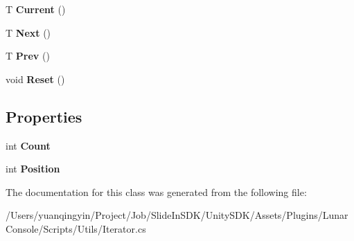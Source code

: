 \begin{DoxyCompactItemize}
T {\bfseries Current} ()
\item 
\mbox{\label{class_lunar_console_plugin_internal_1_1_iterator_a740bda9b06afc0dfcdf64cd828bdd88b}} 
T {\bfseries Next} ()
\item 
\mbox{\label{class_lunar_console_plugin_internal_1_1_iterator_a524207c5acfe8e4b395f27b723c80acf}} 
T {\bfseries Prev} ()
\item 
\mbox{\label{class_lunar_console_plugin_internal_1_1_iterator_a2bc5705d20b3c44dd0ae2b2ce7c2a223}} 
void {\bfseries Reset} ()
\end{DoxyCompactItemize}
\subsection*{Properties}
\begin{DoxyCompactItemize}
\item 
\mbox{\label{class_lunar_console_plugin_internal_1_1_iterator_aaf9e134feb0f8ded1712421d956e7b70}} 
int {\bfseries Count}
\item 
\mbox{\label{class_lunar_console_plugin_internal_1_1_iterator_a8586316508c9c1b208a28c96af3e0c33}} 
int {\bfseries Position}
\end{DoxyCompactItemize}


The documentation for this class was generated from the following file\+:\begin{DoxyCompactItemize}
\item 
/\+Users/yuanqingyin/\+Project/\+Job/\+Slide\+In\+S\+D\+K/\+Unity\+S\+D\+K/\+Assets/\+Plugins/\+Lunar\+Console/\+Scripts/\+Utils/Iterator.\+cs\end{DoxyCompactItemize}
